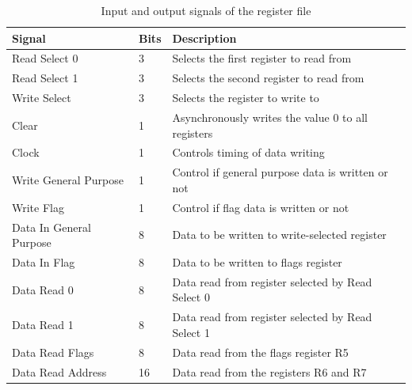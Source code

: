 \begin{table}[H]
    \centering
    \begin{tabular}{|l|l|l|} 
        \hline
        \textbf{\textbf{Signal}} & \textbf{Bits} & \textbf{Description}                                \\ 
        \hline
        Read Select 0            & 3             & Selects the first register to read from             \\ 
        \hline
        Read Select 1            & 3             & Selects the second register to read from            \\ 
        \hline
        Write Select             & 3             & Selects the register to write to                    \\ 
        \hline
        Clear                    & 1             & Asynchronously writes the value 0 to all registers  \\ 
        \hline
        Clock                    & 1             & Controls timing of data writing                     \\ 
        \hline
        Write General Purpose    & 1             & Control if general purpose data is written or not   \\ 
        \hline
        Write Flag               & 1             & Control if flag data is written or not              \\ 
        \hline
        Data In General Purpose  & 8             & Data to be written to write-selected register       \\ 
        \hline
        Data In Flag             & 8             & Data to be written to flags register                \\
        \hline
        Data Read 0              & 8             & Data read from register selected by Read Select 0   \\
        \hline
        Data Read 1              & 8             & Data read from register selected by Read Select 1   \\
        \hline
        Data Read Flags          & 8             & Data read from the flags register R5                \\
        \hline
        Data Read Address        & 16            & Data read from the registers R6 and R7              \\
        \hline
    \end{tabular}
    \caption{Input and output signals of the register file}
    \label{tab:implementation_logical_register_file_io}
\end{table}

